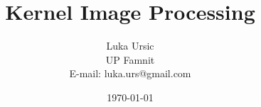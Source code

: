 \documentclass{article}
\title{Kernel Image Processing}
\author{Luka Ursic \\ UP Famnit \\ E-mail: luka.urs@gmail.com}
\date{\today}
\begin{document}
\maketitle
\thispagestyle{empty}

\begin{abstract}
    \lipsum[1]
\end{abstract}
\end{document}
